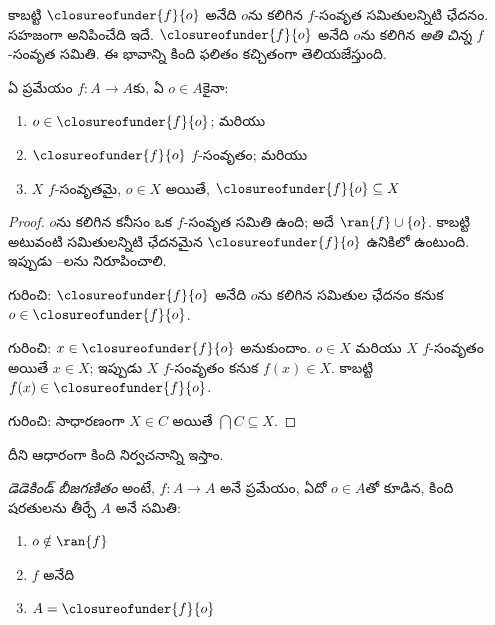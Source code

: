 \documentclass[../../../include/open-logic-section]{subfiles}
\begin{document}
కాబట్టి $\closureofunder{f}{o}$ అనేది $o$ను  కలిగిన
$f$-సంవృత సమితులన్నిటి ఛేదనం. సహజంగా అనిపించేది ఇదే.
$\closureofunder{f}{o}$ అనేది $o$ను  కలిగిన
\emph{అతి చిన్న} $f$-సంవృత సమితి. ఈ భావాన్ని కింది
ఫలితం కచ్చితంగా తెలియజేస్తుంది.
\begin{lem}
	ఏ ప్రమేయం $f \colon A \to A$కు, ఏ $o \in A$కైనా:
	\begin{enumerate}
		\item{} $o \in \closureofunder{f}{o}$; మరియు
		\item{} $\closureofunder{f}{o}$ $f$-సంవృతం; మరియు
		\item{} $X$ $f$-సంవృతమై, $o \in
		X$ అయితే, $\closureofunder{f}{o} \subseteq X$
	\end{enumerate}
\end{lem}

\begin{proof}
$o$ను  కలిగిన కనీసం ఒక $f$-సంవృత సమితి ఉంది; అదే
$\ran{f}\cup \{o\}$. కాబట్టి అటువంటి సమితులన్నిటి ఛేదనమైన
$\closureofunder{f}{o}$ ఉనికిలో ఉంటుంది. ఇప్పుడు
--లను నిరూపించాలి.

 గురించి: $\closureofunder{f}{o}$ అనేది
$o$ను  కలిగిన సమితుల ఛేదనం కనుక
$o \in \closureofunder{f}{o}$.

 గురించి: $x \in \closureofunder{f}{o}$
అనుకుందాం. $o \in X$ మరియు $X$ $f$-సంవృతం అయితే $x \in X$;
ఇప్పుడు $X$ $f$-సంవృతం కనుక $f(x) \in X$. కాబట్టి
$f(x) \in \closureofunder{f}{o}$.

 గురించి: సాధారణంగా $X \in C$ అయితే
$\bigcap C \subseteq X$.
\end{proof}

దీని ఆధారంగా కింది నిర్వచనాన్ని ఇస్తాం.

\begin{defn}
\emph{డెడెకిండ్ బీజగణితం} అంటే, $f \colon A \to A$ అనే ప్రమేయం,
ఏదో $o \in A$తో కూడిన, కింది షరతులను తీర్చే $A$ అనే సమితి:
	\begin{enumerate}
		\item {} $o \notin \ran{f}$
		\item {} $f$ అనేది 
		\item {} $A = \closureofunder{f}{o}$
	\end{enumerate}
\end{defn}
\end{document}
